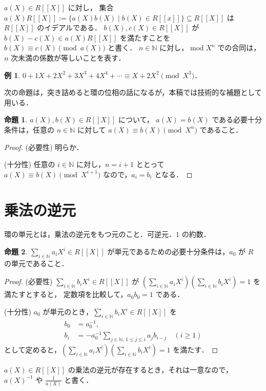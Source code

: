 \documentclass{jsarticle}
\DeclareMathOperator{\Mod}{mod}
\newcommand{\N}{\mathbb{N}}
\theoremstyle{definition}
\newtheorem*{Exm}{例}
\newtheorem{Prp}{命題}
\newenvironment{exm}{\begin{leftbar}\begin{Exm}}{\end{Exm}\end{leftbar}}
\newenvironment{prp}{\vspace{1ex}\begin{screen}\begin{Prp}}{\end{Prp}\end{screen}}
\newenvironment{prf}{\begin{leftbar}\begin{proof}}{\end{proof}\end{leftbar}}
\begin{document}
$a(X) \in R[[X]]$ に対し，
集合 $a(X) R[[X]] := \{ a(X) b(X) \mid b(X) \in R[[x]] \} \subseteq R[[X]]$ は
$R[[X]]$ のイデアルである．
$b(X), c(X) \in R[[X]]$ が $b(X) - c(X) \in a(X) R[[X]]$ を満たすことを
$b(X) \equiv c(X) \pmod{a(X)}$ と書く．
$n \in \N$ に対し，$\Mod X^n$ での合同は，$n$ 次未満の係数が等しいことを表す．

\begin{exm}
  $0 + 1 X + 2 X^2 + 3 X^3 + 4 X^4 + \cdots \equiv X + 2 X^2 \pmod{X^3}$．
\end{exm}

次の命題は，突き詰めると環の位相の話になるが，本稿では技術的な補題として用いる．

\begin{prp}
  \label{prp:mod-limit}
  $a(X), b(X) \in R[[X]]$ について，
  $a(X) = b(X)$ である必要十分条件は，任意の $n \in \N$ に対して $a(X) \equiv b(X) \pmod{X^n}$ であること．
\end{prp}
\begin{prf}
  (必要性)
  明らか．

  (十分性)
  任意の $i \in \N$ に対し，$n = i + 1$ ととって $a(X) \equiv b(X) \pmod{X^{i+1}}$ なので，$a_i = b_i$ となる．
\end{prf}

\section{乗法の逆元}
環の単元とは，乗法の逆元をもつ元のこと．可逆元．$1$ の約数．

\begin{prp}
  $\sum_{i\in\N} a_i X^i \in R[[X]]$ が単元であるための必要十分条件は，$a_0$ が $R$ の単元であること．
\end{prp}
\begin{prf}
  (必要性)
  $\sum_{i\in\N} b_i X^i \in R[[X]]$ が $\left(\sum_{i\in\N} a_i X^i\right) \left(\sum_{i\in\N} b_i X^i\right) = 1$ を満たすとすると，
  定数項を比較して，$a_0 b_0 = 1$ である．

  (十分性)
  $a_0$ が単元のとき，$\sum_{i\in\N} b_i X^i \in R[[X]]$ を
  \begin{align*}
    b_0 &= a_0^{-1}, \\
    b_i &= -a_0^{-1} \sum_{j\in\N,\,1\le j\le i} a_j b_{i-j} \quad (i \ge 1)
  \end{align*}
  として定めると，$\left(\sum_{i\in\N} a_i X^i\right) \left(\sum_{i\in\N} b_i X^i\right) = 1$ を満たす．
\end{prf}

$a(X) \in R[[X]]$ の乗法の逆元が存在するとき，それは一意なので，
$a(X)^{-1}$ や $\frac{1}{a(X)}$ と書く．
\end{document}
